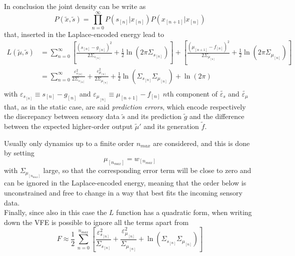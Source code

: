 \documentclass[a4paper, 10pt]{article}
\begin{document}
In conclusion the joint density can be write as
\begin{equation}
P(\tilde{x}, \tilde{s}) = \prod_{n=0}^{\infty} P(s_{[n]} | x_{[n]}) P(x_{[n+1]} | x_{[n]})
\end{equation}
that, inserted in the Laplace-encoded energy lead to 
\begin{equation}
\begin{split}
L(\tilde{\mu}, \tilde{s}) &= \sum_{n=0}^{\infty} \left[ \frac{(s_{[n]}-g_{[n]})^2}{2 \Sigma_{s_{[n]}}} + \frac{1}{2} \ln (2 \pi \Sigma_{s_{[n]}}) \right] + \left[ \frac{(\mu_{[n+1]}-f_{[n]})^2}{2 \Sigma_{\mu_{[n]}}} + \frac{1}{2} \ln (2 \pi \Sigma_{\mu_{[n]}}) \right] \\
	&= \sum_{n=0}^{\infty} \frac{\varepsilon_{s_{[n]}}^2}{2 \Sigma_{s_{[n]}}} + \frac{\varepsilon_{\mu_{[n]}}^2}{2 \Sigma_{\mu_{[n]}}} + \frac{1}{2} \ln (\Sigma_{s_{[n]}}\Sigma_{\mu_{[n]}}) + \ln(2 \pi)\\
\end{split}
\end{equation}
with $\varepsilon_{s_{[n]}} \equiv s_{[n]}-g_{[n]}$ and $\varepsilon_{\mu_{[n]}} \equiv \mu_{[n+1]}-f_{[n]}$ $n$th component of $\tilde{\varepsilon_{s}}$ and $\tilde{\varepsilon_{\mu}}$ that, as in the static case, are said \emph{prediction errors}, which encode respectively the discrepancy between sensory data $\tilde{s}$ and its prediction $\tilde{g}$ and the difference between the expected higher-order output $\tilde{\mu}'$ and its generation $\tilde{f}$.

Usually only dynamics up to a finite order $n_{max}$ are considered, and this is done by setting 
\begin{equation}
\mu_{[n_{max}]} = w_{[n_{max}]}
\end{equation}
with $\Sigma_{\mu_[n_{max}]}$ large, so that the corresponding error term will be close to zero and can be ignored in the Laplace-encoded energy, meaning that the order below is unconstrained and free to change in a way that best fits the incoming sensory data.\\
Finally, since also in this case the $L$ function has a quadratic form, when writing down the VFE is possible to ignore all the terms apart from
\begin{equation}
F \approx \frac{1}{2} \, \sum_{n=0}^{n_{max}} \left[ \frac{\varepsilon_{s_{[n]}}^2}{ \Sigma_{s_{[n]}}} + \frac{\varepsilon_{\mu_{[n]}}^2}{\Sigma_{\mu_{[n]}}} + \ln (\Sigma_{s_{[n]}}\Sigma_{\mu_{[n]}}) \right]
\end{equation}
\end{document}
